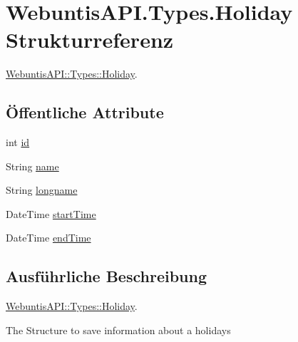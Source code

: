 \hypertarget{struct_webuntis_a_p_i_1_1_types_1_1_holiday}{\section{Webuntis\-A\-P\-I.\-Types.\-Holiday Strukturreferenz}
\label{struct_webuntis_a_p_i_1_1_types_1_1_holiday}
}


\hyperlink{struct_webuntis_a_p_i_1_1_types_1_1_holiday}{Webuntis\-A\-P\-I\-::\-Types\-::\-Holiday}.  


\subsection*{Öffentliche Attribute}
\begin{DoxyCompactItemize}
\item 
int \hyperlink{struct_webuntis_a_p_i_1_1_types_1_1_holiday_af850132078feaf8f2395e20a0800d74a}{id}
\item 
String \hyperlink{struct_webuntis_a_p_i_1_1_types_1_1_holiday_a092c9f61df2c8287135afb4551cbacdc}{name}
\item 
String \hyperlink{struct_webuntis_a_p_i_1_1_types_1_1_holiday_afb7e41fafeec189033e04da99946817f}{longname}
\item 
Date\-Time \hyperlink{struct_webuntis_a_p_i_1_1_types_1_1_holiday_a489a91e746530bfed3300c39533297f1}{start\-Time}
\item 
Date\-Time \hyperlink{struct_webuntis_a_p_i_1_1_types_1_1_holiday_a8554b4c5a0b600762065145df7666519}{end\-Time}
\end{DoxyCompactItemize}


\subsection{Ausführliche Beschreibung}
\hyperlink{struct_webuntis_a_p_i_1_1_types_1_1_holiday}{Webuntis\-A\-P\-I\-::\-Types\-::\-Holiday}. 

The Structure to save information about a holidays 

